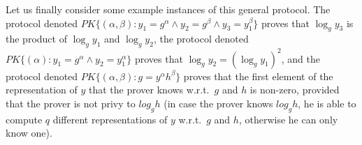 Let us finally consider some example instances of this general protocol.
The protocol denoted
$\mathit{PK}\{(\alpha,\beta): y_1 = g^{\alpha} \wedge y_2 = g^{\beta} 
\wedge y_3 = y_1^{\beta}\}$
proves that 
$\log_g y_3$ is the product of $\log_g y_1$ and $\log_g y_2$,
the protocol denoted 
$\mathit{PK}\{(\alpha): y_1 = g^{\alpha} \wedge y_2 = y_1^{\alpha}\}$
proves that $\log_g y_2 = (\log_g y_1)^2$,
and 
the protocol denoted
$\mathit{PK}\{(\alpha,\beta): g = y^{\alpha} h^{\beta}\}$
proves that the first element of the representation of $y$
that the prover knows w.r.t.\ $g$ and $h$ is non-zero, provided that the prover is not privy
to $log_g h$
(in case the prover knows $log_g h$, he is able to compute $q$ different 
representations of $y$ w.r.t.\ $g$ and $h$, otherwise he can only know one).



